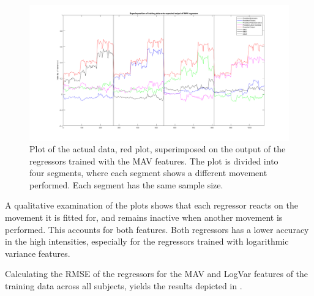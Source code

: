 \begin{figure}[H]
	\includegraphics[width=1\textwidth]{figures/results/SuperPositionTestDataMAV}  %
	\caption{Plot of the actual data, red plot, superimposed on the output of the regressors trained with the MAV features. The plot is divided into four segments, where each segment shows a different movement performed. Each segment has the same sample size.}
	\label{fig:SuperPositionTestDataMAV}  %
\end{figure}


A qualitative examination of the plots shows that each regressor reacts on the movement it is fitted for, and remains inactive when another movement is performed. This accounts for both features. Both regressors has a lower accuracy in the high intensities, especially for the regressors trained with logarithmic variance features. 
  


Calculating the RMSE of the regressors for the MAV and LogVar features of the training data across all subjects, yields the results depicted in . 

